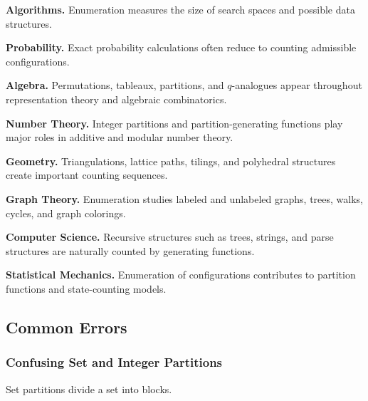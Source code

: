 \begin{applicationbox}

\textbf{Algorithms.}
Enumeration measures the size of search spaces and possible data
structures.

\medskip

\textbf{Probability.}
Exact probability calculations often reduce to counting admissible
configurations.

\medskip

\textbf{Algebra.}
Permutations, tableaux, partitions, and \(q\)-analogues appear
throughout representation theory and algebraic combinatorics.

\medskip

\textbf{Number Theory.}
Integer partitions and partition-generating functions play major roles
in additive and modular number theory.

\medskip

\textbf{Geometry.}
Triangulations, lattice paths, tilings, and polyhedral structures create
important counting sequences.

\medskip

\textbf{Graph Theory.}
Enumeration studies labeled and unlabeled graphs, trees, walks, cycles,
and graph colorings.

\medskip

\textbf{Computer Science.}
Recursive structures such as trees, strings, and parse structures are
naturally counted by generating functions.

\medskip

\textbf{Statistical Mechanics.}
Enumeration of configurations contributes to partition functions and
state-counting models.

\end{applicationbox}

\subsection{Common Errors}
\label{subsec:enumerative-combinatorics-common-errors}

\subsubsection{Confusing Set and Integer Partitions}

Set partitions divide a set into blocks.

